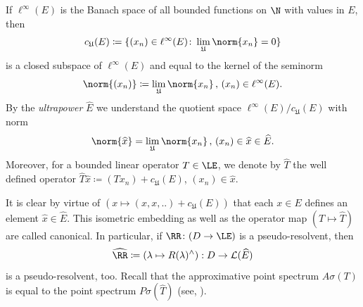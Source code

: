 If\/ $\ell^{\infty}(E)$ is the Banach space of all bounded functions on $\N $ with values in $E$, then
\[
c_{\mathfrak{U}}(E) \coloneqq \{(x_{n}) \in \ell^{\infty}(E) \colon \lim_{\mathfrak{U}}\norm{x_{n}} = 0\}
\]
is a closed subspace of\/ $\ell^{\infty}(E)$ and equal to the kernel of the seminorm
\[
\norm{(x_{n})} \coloneqq \lim_{\mathfrak{U}}\norm{x_{n}} \, , \, (x_{n}) \in \ell^{\infty}(E).
\]
By the \emph{ultrapower} $\widehat{E}$ we understand the quotient space $\ell^{\infty}(E)/c_{\mathfrak{U}}(E)$ with norm
\[
\norm{\widehat{x}} = \lim_{\mathfrak{U}}\norm{x_{n}} \, , \, (x_{n}) \in \widehat{x} \in \widehat{E}.
\]
Moreover, for a bounded linear operator $T \in \LE$, we denote by $\widehat{T}$ the well defined operator $\widehat{T}\widehat{x} \coloneqq (Tx_{n}) + c_{\mathfrak{U}}(E)$, $(x_{n}) \in \widehat{x}$.

It is clear by virtue of\/ $(x \mapsto (x, x, ..) + c_{\mathfrak{U}}(E))$ that each $x \in E$ defines an element $\widehat{x} \in \widehat{E}$.
This isometric embedding as well as the operator map $(T \mapsto \widehat{T})$ are called canonical.
In particular, if\/ $\RR \colon (D \to \LE)$ is a pseudo-resolvent, then
\[
\widehat{\RR} \coloneqq (\lambda \mapsto R(\lambda)^{\wedge}): D \to \mathcal{L}(\widehat{E})
\]
is a pseudo-resolvent, too.
Recall that the approximative point spectrum $A{\sigma}(T)$ is equal to the point spectrum $P{\sigma}(\widehat{T})$ (see, \eg \textcite[Chapter V, §1]{schaefer:1974}).

